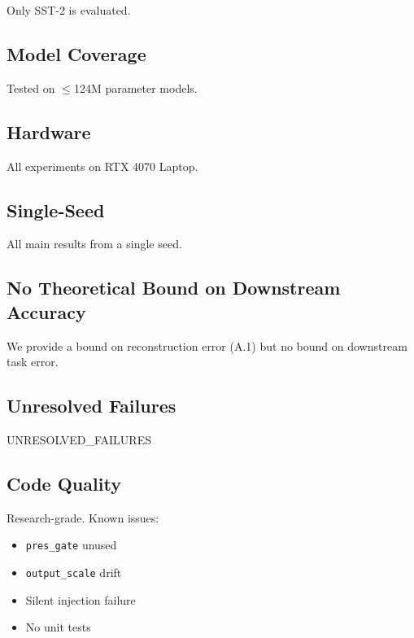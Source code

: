 Only SST-2 is evaluated.

\subsection{Model Coverage}

Tested on $\le$124M parameter models.

\subsection{Hardware}

All experiments on RTX 4070 Laptop.

\subsection{Single-Seed}

All main results from a single seed.

\subsection{No Theoretical Bound on Downstream Accuracy}

We provide a bound on reconstruction error (A.1) but no bound on 
downstream task error.

\subsection{Unresolved Failures}

{{UNRESOLVED\_FAILURES}}

\subsection{Code Quality}

Research-grade. Known issues:
\begin{itemize}
\item \texttt{pres\_gate} unused
\item \texttt{output\_scale} drift
\item Silent injection failure
\item No unit tests

\end{itemize}
